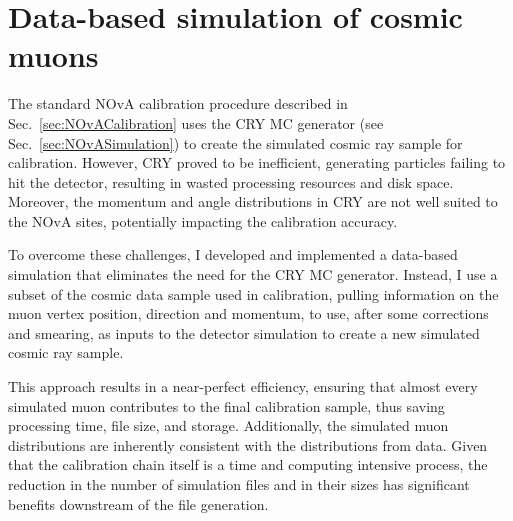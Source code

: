 
\chapter{Data-based simulation of cosmic muons}\label{sec:DataBasedSimulation}

The standard \gls{NOvA} calibration procedure described in Sec.~\ref{sec:NOvACalibration} uses the \gls{CRY} \gls{MC} generator (see Sec.~\ref{sec:NOvASimulation}) to create the simulated cosmic ray sample for calibration. However, \gls{CRY} proved to be inefficient, generating particles failing to hit the detector, resulting in wasted processing resources and disk space. Moreover, the momentum and angle distributions in \gls{CRY} are not well suited to the \gls{NOvA} sites, potentially impacting the calibration accuracy.

To overcome these challenges, I developed and implemented a data-based simulation that eliminates the need for the \gls{CRY} \gls{MC} generator. Instead, I use a subset of the cosmic data sample used in calibration, pulling information on the muon vertex position, direction and momentum, to use, after some corrections and smearing, as inputs to the detector simulation to create a new simulated cosmic ray sample.

This approach results in a near-perfect efficiency, ensuring that almost every simulated muon contributes to the final calibration sample, thus saving processing time, file size, and storage. Additionally, the simulated muon distributions are inherently consistent with the distributions from data. Given that the calibration chain itself is a time and computing intensive process, the reduction in the number of simulation files and in their sizes has significant benefits downstream of the file generation. 

